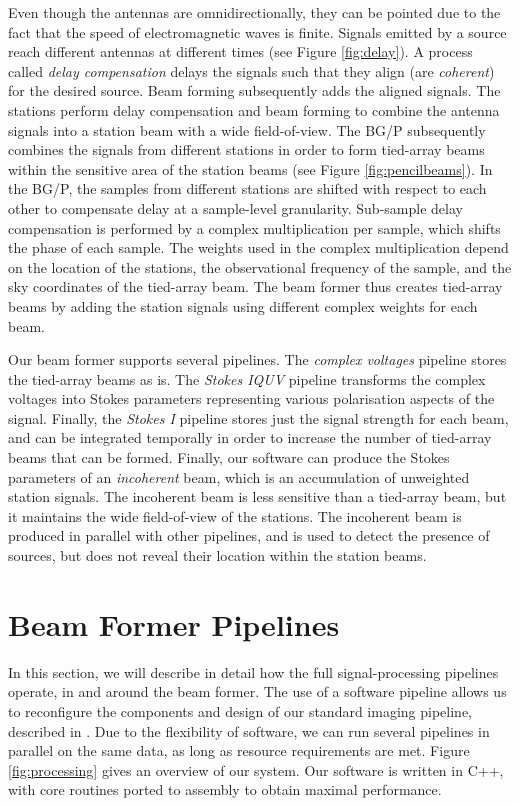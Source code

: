 \documentclass{llncs}
\begin{document}
Even though the antennas are omnidirectionally, they can be pointed due to the fact that the speed of electromagnetic waves is finite. Signals emitted by a source reach different antennas at different times (see Figure \ref{fig:delay}). A process called \emph{delay compensation} delays the signals such that they align (are \emph{coherent}) for the desired source. Beam forming subsequently adds the aligned signals. The stations perform delay compensation and beam forming to combine the antenna signals into a station beam with a wide field-of-view. The BG/P subsequently combines the signals from different stations in order to form tied-array beams within the sensitive area of the station beams (see Figure \ref{fig:pencilbeams}). In the BG/P, the samples from different stations are shifted with respect to each other to compensate delay at a sample-level granularity. Sub-sample delay compensation is performed by a complex multiplication per sample, which shifts the phase of each sample. The weights used in the complex multiplication depend on the location of the stations, the observational frequency of the sample, and the sky coordinates of the tied-array beam. The beam former thus creates tied-array beams by adding the station signals using different complex weights for each beam.

Our beam former supports several pipelines. The \emph{complex voltages} pipeline stores the tied-array beams as is. The \emph{Stokes IQUV} pipeline transforms the complex voltages into Stokes parameters representing various polarisation aspects of the signal. Finally, the \emph{Stokes I} pipeline stores just the signal strength for each beam, and can be integrated temporally in order to increase the number of tied-array beams that can be formed. Finally, our software can produce the Stokes parameters of an \emph{incoherent} beam, which is an accumulation of unweighted station signals. The incoherent beam is less sensitive than a tied-array beam, but it maintains the wide field-of-view of the stations. The incoherent beam is produced in parallel with other pipelines, and is used to detect the presence of sources, but does not reveal their location within the station beams.

\section{Beam Former Pipelines}
\label{Sec:pipelines}

In this section, we will describe in detail how the full signal-processing pipelines operate, in and around the beam former. The use of a software pipeline allows us to reconfigure the components and design of our standard imaging pipeline, described in \cite{Romein:10a}. Due to the flexibility of software, we can run several pipelines in parallel on the same data, as long as resource requirements are met. Figure \ref{fig:processing} gives an overview of our system. Our software is written in C++, with core routines ported to assembly to obtain maximal performance.
\end{document}

